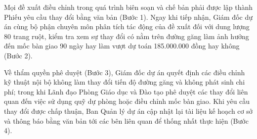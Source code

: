 Mọi đề xuất điều chỉnh trong quá trình biên soạn và chế bản phải được lập thành Phiếu yêu cầu thay đổi bằng văn bản (Bước 1). Ngay khi tiếp nhận, Giám đốc dự án cùng bộ phận chuyên môn phân tích tác động của đề xuất đối với dung lượng 80 trang ruột, kiểm tra xem sự thay đổi có nằm trên đường găng làm ảnh hưởng đến mốc bàn giao 90 ngày hay làm vượt dự toán 185.000.000 đồng hay không (Bước 2).

Về thẩm quyền phê duyệt (Bước 3), Giám đốc dự án quyết định các điều chỉnh kỹ thuật nội bộ không làm thay đổi tiến độ đường găng và không phát sinh chi phí; trong khi Lãnh đạo Phòng Giáo dục và Đào tạo phê duyệt các thay đổi liên quan đến việc sử dụng quỹ dự phòng hoặc điều chỉnh mốc bàn giao. Khi yêu cầu thay đổi được chấp thuận, Ban Quản lý dự án cập nhật lại tài liệu kế hoạch cơ sở và thông báo bằng văn bản tới các bên liên quan để thống nhất thực hiện (Bước 4).

